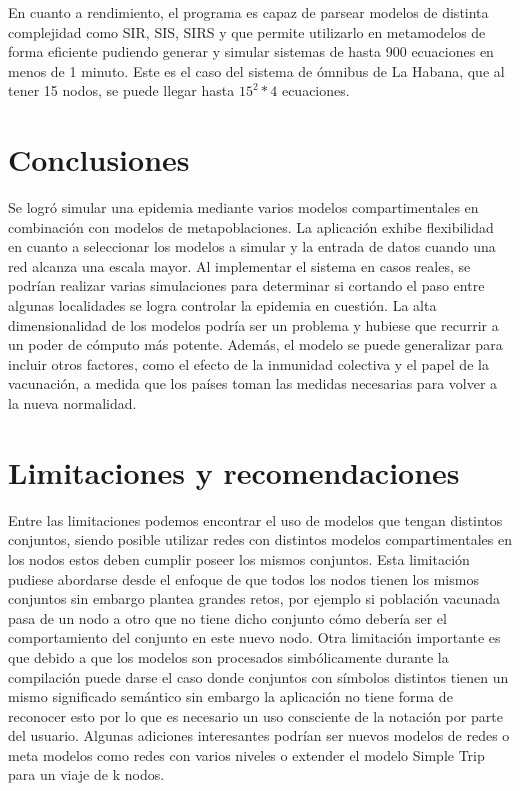 \documentclass[a4paper,10pt,twocolumn]{article}
\begin{document}
En cuanto a rendimiento, el programa es capaz de parsear modelos de distinta complejidad como SIR, SIS, SIRS y que permite utilizarlo en metamodelos de forma eficiente pudiendo generar y simular sistemas de hasta 900 ecuaciones en menos de 1 minuto. Este es el caso del sistema de \'omnibus de La Habana, que al tener 15 nodos, se puede llegar hasta  $15^2 * 4$ ecuaciones.


\section{Conclusiones}\label{sec:conc}

Se logr\'o simular una epidemia mediante varios modelos compartimentales en combinaci\'on con modelos de metapoblaciones. La aplicaci\'on exhibe flexibilidad en cuanto a seleccionar los modelos a simular y la entrada de datos cuando una red alcanza una escala mayor. Al implementar el sistema en casos reales, se podr\'ian realizar varias simulaciones para determinar si cortando el paso entre algunas localidades se logra controlar la epidemia en cuesti\'on. La alta dimensionalidad de los modelos podr\'ia ser un problema y hubiese que recurrir a un poder de c\'omputo m\'as potente. Además, el modelo se puede generalizar para incluir otros factores, como el efecto de la inmunidad colectiva y el papel de la vacunación, a medida que los países toman las medidas necesarias para volver a la nueva normalidad.




\section{Limitaciones y recomendaciones}\label{sec:rec}

Entre las limitaciones podemos encontrar el uso de modelos que tengan distintos conjuntos, siendo
posible utilizar redes con distintos modelos compartimentales en los nodos estos deben cumplir
poseer los mismos conjuntos. Esta limitación pudiese abordarse desde el enfoque de que todos los
nodos tienen los mismos conjuntos sin embargo plantea grandes retos, por ejemplo si población
vacunada pasa de un nodo a otro que no tiene dicho conjunto cómo debería ser el comportamiento
del conjunto en este nuevo nodo.
Otra limitación importante es que debido a que los modelos son procesados simbólicamente
durante la compilación puede darse el caso donde conjuntos con símbolos distintos tienen un
mismo significado semántico sin embargo la aplicación no tiene forma de reconocer esto por lo que
es necesario un uso consciente de la notación por parte del usuario.
Algunas adiciones interesantes podrían ser nuevos modelos de redes o meta modelos como redes
con varios niveles o extender el modelo Simple Trip para un viaje de k nodos.
\end{document}
